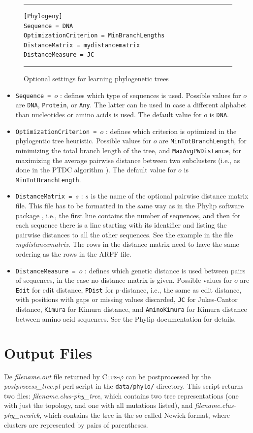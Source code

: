 \documentclass[a4paper]{report}
\newcommand{\clusphy}{\textsc{Clus}-$\varphi$}
\begin{document}
\begin{figure}[tb]
\hrule\vspace{1em}
\begin{verbatim}
[Phylogeny]
Sequence = DNA
OptimizationCriterion = MinBranchLengths
DistanceMatrix = mydistancematrix
DistanceMeasure = JC
\end{verbatim}
\hrule
\caption{Optional settings for learning phylogenetic trees}
\label{phylosettingsopt:fig}
\end{figure}

\begin{itemize}
\item {\tt Sequence = $o$} : defines which type of sequences is used. Possible values for $o$ are {\tt DNA}, {\tt Protein}, or {\tt Any}. The latter can be used in case a different alphabet than nucleotides or amino acids is used. The default value for $o$ is {\tt DNA}.
\item {\tt OptimizationCriterion = $o$} : defines which criterion is optimized in the phylogentic tree heuristic. Possible values for $o$ are {\tt MinTotBranchLength}, for minimizing the total branch length of the tree, and {\tt MaxAvgPWDistance}, for maximizing the average pairwise distance between two subclusters (i.e., as done in the PTDC algorithm \cite{Arslan07:proc}). The default value for $o$ is {\tt MinTotBranchLength}.
\item {\tt DistanceMatrix = $s$} : $s$ is the name of the optional pairwise distance matrix file. This file has to be formatted in the same way as in the Phylip software package \cite{Phylip3.6-08:misc}, i.e., the first line contains the number of sequences, and then for each sequence there is a line starting with its identifier and listing the pairwise distances to all the other sequences. See the example in the file \emph{mydistancematrix}. The rows in the distance matrix need to have the same ordering as the rows in the ARFF file.
\item {\tt DistanceMeasure = $o$} : defines which genetic distance is used between pairs of sequences, in the case no distance matrix is given. Possible values for $o$ are {\tt Edit} for edit distance, {\tt PDist} for p-distance, i.e., the same as edit distance, with positions with gaps or missing values discarded, {\tt JC} for Jukes-Cantor distance, {\tt Kimura} for Kimura distance, and {\tt AminoKimura} for Kimura distance between amino acid sequences. See the Phylip documentation \cite{Phylip3.6-08:misc} for details.
\end{itemize}

\section{Output Files}
De \emph{filename.out} file returned by \clusphy{} can be postprocessed by the \emph{postprocess\_tree.pl} perl script in the {\tt data/phylo/} directory. This script returns two files: \emph{filename.clus-phy\_tree}, which contains two tree representations (one with just the topology, and one with all mutations listed), and \emph{filename.clus-phy\_newick}, which contains the tree in the so-called Newick format, where clusters are represented by pairs of parentheses.




\end{document}
